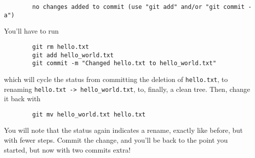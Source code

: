 \begin{enumerate}
\begin{verbatim}
        no changes added to commit (use "git add" and/or "git commit -a")
        \end{verbatim}
        You'll have to run
        \begin{verbatim}
        git rm hello.txt
        git add hello_world.txt
        git commit -m "Changed hello.txt to hello_world.txt"
        \end{verbatim}
        which will cycle the status from committing the deletion of
        \verb+hello.txt+, to renaming \verb+hello.txt -> hello_world.txt+,
        to, finally, a clean tree.
        Then, change it back with
        \begin{verbatim}
        git mv hello_world.txt hello.txt
        \end{verbatim}
        You will note that the status again indicates a rename, exactly like
        before, but with fewer steps.
        Commit the change, and you'll be back to the point you started, but
        now with two commits extra!


\end{enumerate}
